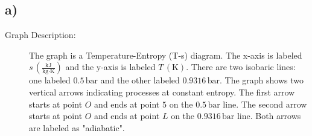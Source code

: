 

\subsection*{a)}

\begin{description}
    \item[Graph Description:] The graph is a Temperature-Entropy (T-s) diagram. The x-axis is labeled \( s \, (\frac{\text{kJ}}{\text{kg} \cdot \text{K}}) \) and the y-axis is labeled \( T \, (\text{K}) \). There are two isobaric lines: one labeled \( 0.5 \, \text{bar} \) and the other labeled \( 0.9316 \, \text{bar} \). The graph shows two vertical arrows indicating processes at constant entropy. The first arrow starts at point \( O \) and ends at point \( 5 \) on the \( 0.5 \, \text{bar} \) line. The second arrow starts at point \( O \) and ends at point \( L \) on the \( 0.9316 \, \text{bar} \) line. Both arrows are labeled as "adiabatic".
\end{description}
